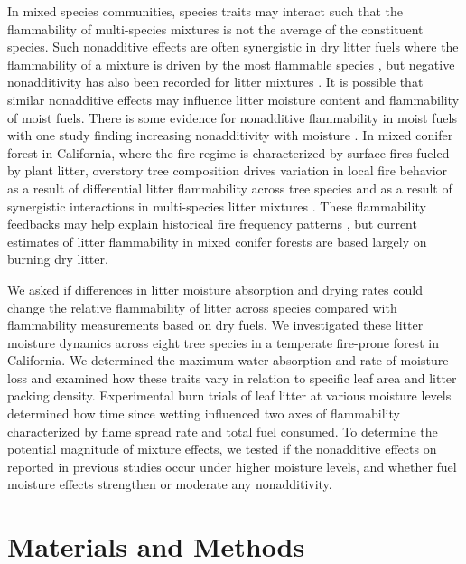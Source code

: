 \documentclass[letterpaper,12pt]{article}
\begin{document}
In mixed species communities, species traits may interact such that the
flammability of multi-species mixtures is not the average of the constituent
species. Such nonadditive effects are often synergistic in dry litter fuels
where the flammability of a mixture is driven by the most flammable species
\citep{VanAltena+Logtestjin+etal-2012, Magalhaes+Schwilk-2012}, but negative
nonadditivity has also been recorded for litter mixtures
\citep{Blauw+Wensink+etal-2015, Zhao+vanLogtestijn+etal-2019}. It is possible
that similar nonadditive effects may influence litter moisture content and
flammability of moist fuels. There is some evidence for nonadditive
flammability in moist fuels with one study finding increasing nonadditivity
with moisture \citep{Blauw+Wensink+etal-2015}. In mixed conifer forest in
California, where the fire regime is characterized by surface fires fueled by
plant litter, overstory tree composition drives variation in local fire
behavior \citep{Schwilk+Caprio-2011} as a result of differential litter
flammability across tree species and as a result of synergistic interactions in
multi-species litter mixtures \citep{Magalhaes+Schwilk-2012}. These
flammability feedbacks may help explain historical fire frequency patterns
\citep{Schwilk+Caprio-2011}, but current estimates of litter flammability in
mixed conifer forests are based largely on burning dry litter.

We asked if differences in litter moisture absorption and drying rates could
change the relative flammability of litter across species compared with
flammability measurements based on dry fuels. We investigated these litter
moisture dynamics across eight tree species in a temperate fire-prone forest in
California. We determined the maximum water absorption and rate of moisture
loss and examined how these traits vary in relation to specific leaf area and
litter packing density. Experimental burn trials of leaf litter at various
moisture levels determined how time since wetting influenced two axes of
flammability characterized by flame spread rate and total fuel consumed. To
determine the potential magnitude of mixture effects, we tested if the
nonadditive effects on reported in previous studies occur under higher moisture
levels, and whether fuel moisture effects strengthen or moderate any
nonadditivity.


\section*{Materials and Methods}
\end{document}
